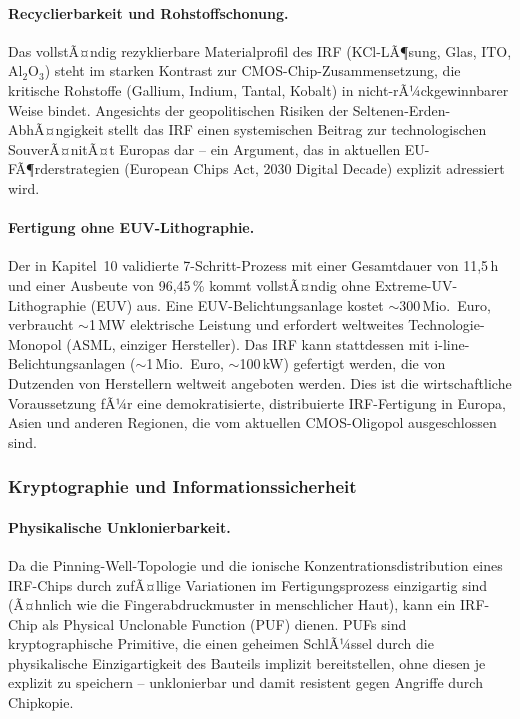﻿\documentclass[a4paper,12pt]{scrreprt}
\theoremstyle{definition}
\begin{document}
\paragraph{Recyclierbarkeit und Rohstoffschonung.}
Das vollstÃ¤ndig rezyklierbare Materialprofil des IRF (KCl-LÃ¶sung,
Glas, ITO, Al$_2$O$_3$) steht im starken Kontrast zur
CMOS-Chip-Zusammensetzung, die kritische Rohstoffe (Gallium, Indium,
Tantal, Kobalt) in nicht-rÃ¼ckgewinnbarer Weise bindet. Angesichts
der geopolitischen Risiken der Seltenen-Erden-AbhÃ¤ngigkeit stellt
das IRF einen systemischen Beitrag zur technologischen SouverÃ¤nitÃ¤t
Europas dar -- ein Argument, das in aktuellen EU-FÃ¶rderstrategien
(European Chips Act, 2030 Digital Decade) explizit adressiert wird.

\paragraph{Fertigung ohne EUV-Lithographie.}
Der in Kapitel~10 validierte 7-Schritt-Prozess mit einer Gesamtdauer
von 11,5\,h und einer Ausbeute von 96,45\,\% kommt vollstÃ¤ndig ohne
Extreme-UV-Lithographie (EUV) aus. Eine EUV-Belichtungsanlage kostet
$\sim$300\,Mio.\ Euro, verbraucht $\sim$1\,MW elektrische Leistung
und erfordert weltweites Technologie-Monopol (ASML, einziger Hersteller).
Das IRF kann stattdessen mit i-line-Belichtungsanlagen ($\sim$1\,Mio.\ Euro,
$\sim$100\,kW) gefertigt werden, die von Dutzenden von Herstellern
weltweit angeboten werden. Dies ist die wirtschaftliche Voraussetzung
fÃ¼r eine demokratisierte, distribuierte IRF-Fertigung in Europa, Asien
und anderen Regionen, die vom aktuellen CMOS-Oligopol ausgeschlossen sind.

\subsubsection{Kryptographie und Informationssicherheit}
\label{subsubsec:kryptographie}

\paragraph{Physikalische Unklonierbarkeit.}
Da die Pinning-Well-Topologie und die ionische Konzentrationsdistribution
eines IRF-Chips durch zufÃ¤llige Variationen im Fertigungsprozess
einzigartig sind (Ã¤hnlich wie die Fingerabdruckmuster in menschlicher
Haut), kann ein IRF-Chip als Physical Unclonable Function (PUF) dienen.
PUFs sind kryptographische Primitive, die einen geheimen SchlÃ¼ssel durch
die physikalische Einzigartigkeit des Bauteils implizit bereitstellen,
ohne diesen je explizit zu speichern -- unklonierbar und damit resistent
gegen Angriffe durch Chipkopie.
\end{document}
